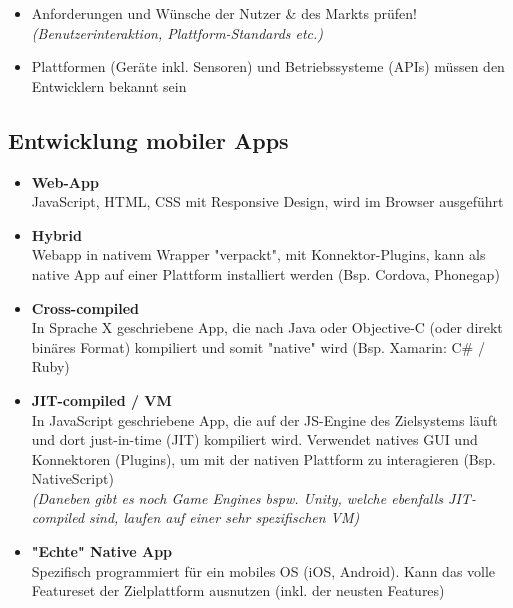 \documentclass[a4paper]{article}
\begin{document}
{\begin{itemize}
		\item Anforderungen und Wünsche der Nutzer \& des Markts prüfen!\\
		\textit{(Benutzerinteraktion, Plattform-Standards etc.)}
		
		\item Plattformen (Geräte inkl. Sensoren) und Betriebssysteme (APIs) müssen den Entwicklern bekannt sein		
		
	\end{itemize}

	\subsection{Entwicklung mobiler Apps}
	
	\begin{itemize}
		
		\item \textbf{Web-App}\\
				JavaScript, HTML, CSS mit Responsive Design, wird im Browser ausgeführt
				
		\item \textbf{Hybrid}\\
				Webapp in nativem Wrapper "verpackt", mit Konnektor-Plugins, kann als native App auf einer Plattform installiert werden (Bsp. Cordova, Phonegap)
		
		\item \textbf{Cross-compiled}\\
				In Sprache X geschriebene App, die nach Java oder Objective-C (oder direkt binäres Format) kompiliert und somit "native" wird (Bsp. Xamarin: C\# / Ruby)
				
		\item \textbf{JIT-compiled / VM}\\
				In JavaScript geschriebene App, die auf der JS-Engine des Zielsystems läuft und dort just-in-time (JIT) kompiliert wird. Verwendet natives GUI und Konnektoren (Plugins), um mit der nativen Plattform zu interagieren (Bsp. NativeScript)\\
				\textit{(Daneben gibt es noch Game Engines bspw. Unity, welche ebenfalls JIT-compiled sind, laufen auf einer sehr spezifischen VM)}			
		
		\item \textbf{"Echte" Native App}\\
				Spezifisch programmiert für ein mobiles OS (iOS, Android). Kann das volle Featureset der Zielplattform ausnutzen (inkl. der neusten Features)
		

\end{itemize}}
\end{document}
